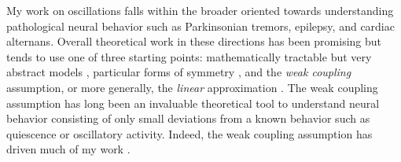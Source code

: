 \documentclass[a4paper,11pt]{article}
\begin{document}
% 
% 
% 
%


My work on oscillations falls within the broader oriented towards understanding pathological neural behavior such as Parkinsonian tremors, epilepsy, and cardiac alternans. Overall theoretical work in these directions has been promising but tends to use one of three starting points: mathematically tractable but very abstract models \cite{ott2008low}, particular forms of symmetry \cite{golubitsky1986hopf}, and the \textit{weak coupling} assumption, or more generally, the \textit{linear} approximation \cite{ermentrout2002modeling}. The weak coupling assumption has long been an invaluable theoretical tool to understand neural behavior consisting of only small deviations from a known behavior such as quiescence or oscillatory activity. Indeed, the weak coupling assumption has driven much of my work \cite{park2016weakly,park2018multiple,park2018scalar}. 
\end{document}
